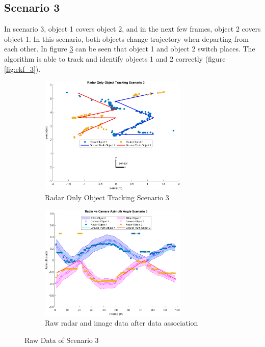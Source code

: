 \subsection{Scenario 3}\label{sec:3-exp_result3}
In scenario 3, object 1 covers object 2, and in the next few frames, object 2 covers object 1.
In this scenario, both objects change trajectory when departing from each other.
In figure \ref*{fig:raw_3} can be seen that object 1 and object 2 switch places.
The algorithm is able to track and identify objects 1 and 2 correctly (figure \ref*{fig:ekf_3}).
\href{https://drive.google.com/file/d/1bd92Bu6CJeL1QIIbBlW42cAozxEcis-d/view?usp=sharing}{\color{blue}{Video}}
\begin{figure}[!htb]
    \hspace{0.1\textwidth}
    \begin{subfigure}[b]{0.3\textwidth}%
        \includegraphics[width=7cm]{Figures/matlab/Radar Only Object Tracking Scenario 3.png}
        \caption{Radar Only Object Tracking Scenario 3}
        \label{subfig:radar_3}
    \end{subfigure}
    \hspace{0.1\textwidth}
    \begin{subfigure}[b]{0.3\textwidth}%
        \includegraphics[width=7cm]{Figures/matlab/Radar vs Camera Azimuth Angle Scenario 3.png}
        \caption{Raw radar and image data after data association}
        \label{subfig:raw_fusion_3}
    \end{subfigure}

    \caption{Raw Data of Scenario 3}
    \label{fig:raw_3}
\end{figure}
